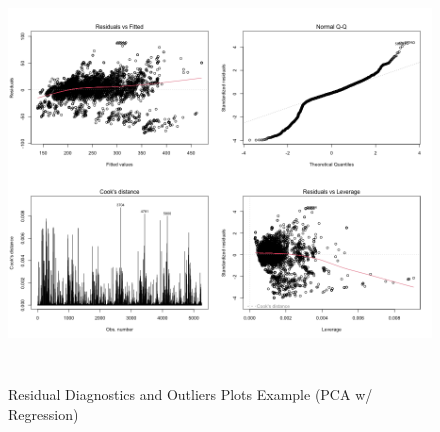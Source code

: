 \documentclass[11pt]{article}
\begin{document}
\begin{figure}[ht!]
\centering
\includegraphics[height = 110mm, width=140mm]{pca_lm_diag.png}
\caption{Residual Diagnostics and Outliers Plots Example (PCA w/ Regression)}
\end{figure}
\end{document}
